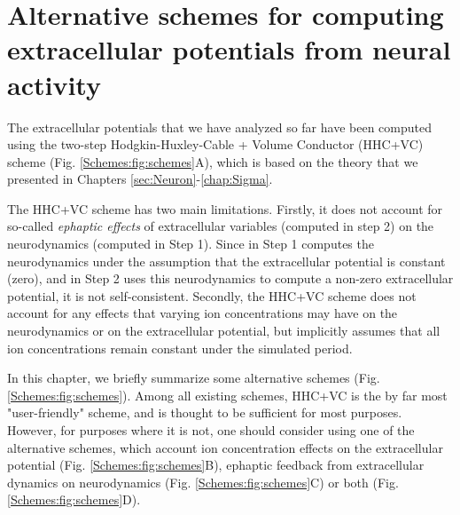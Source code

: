 \chapter{Alternative schemes for computing extracellular potentials from neural activity}
\label{sec:Schemes}

The extracellular potentials that we have analyzed so far have been computed using the two-step Hodgkin-Huxley-Cable + Volume Conductor (HHC+VC) scheme (Fig. \ref{Schemes:fig:schemes}A), which is based on the theory that we presented in Chapters \ref{sec:Neuron}-\ref{chap:Sigma}. 

The HHC+VC scheme has two main limitations. Firstly, it does not account for so-called \textit{ephaptic effects} of extracellular variables (computed in step 2) on the neurodynamics (computed in Step 1). Since in Step 1 computes the neurodynamics under the assumption that the extracellular potential is constant (zero), and in Step 2 uses this neurodynamics to compute a non-zero extracellular potential, it is not self-consistent. Secondly, the HHC+VC scheme does not account for any effects that varying ion concentrations may have on the neurodynamics or on the extracellular potential, but implicitly assumes that all ion concentrations remain constant under the simulated period.

In this chapter, we briefly summarize some alternative schemes (Fig. \ref{Schemes:fig:schemes}).
Among all existing schemes, HHC+VC is the by far most "user-friendly" scheme, and is thought to be sufficient for most purposes. However, for purposes where it is not, one should consider using one of the alternative schemes, which account ion concentration effects on the extracellular potential (Fig. \ref{Schemes:fig:schemes}B), ephaptic feedback from extracellular dynamics on neurodynamics (Fig. \ref{Schemes:fig:schemes}C) or both (Fig. \ref{Schemes:fig:schemes}D).


